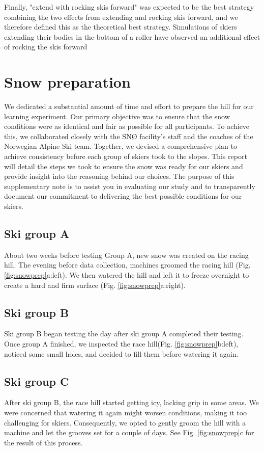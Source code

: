 \documentclass[pdflatex,sn-nature]{sn-jnl}%
\theoremstyle{thmstyleone}%
\theoremstyle{thmstyletwo}%
\theoremstyle{thmstylethree}%
\begin{document}
\begin{appendices}
Finally, "extend with rocking skis forward" was expected to be the best strategy combining the two effects from extending and rocking skis forward, and we therefore defined this as the theoretical best strategy. Simulations of skiers extending their bodies in the bottom of a roller have observed an additional effect of rocking the skis forward \cite{mote_accelerations_1983}


\section{Snow preparation}\label{sup_snowprep}
We dedicated a substantial amount of time and effort to prepare the hill for our learning experiment. Our primary objective was to ensure that the snow conditions were as identical and fair as possible for all participants. To achieve this, we collaborated closely with the SNØ facility’s staff and the coaches of the Norwegian Alpine Ski team. Together, we devised a comprehensive plan to achieve consistency before each group of skiers took to the slopes. This report will detail the steps we took to ensure the snow was ready for our skiers and provide insight into the reasoning behind our choices. The purpose of this supplementary note is to assist you in evaluating our study and to transparently document our commitment to delivering the best possible conditions for our skiers.

\subsection*{Ski group A}
About two weeks before testing Group A, new snow was created on the racing hill. The evening before data collection, machines groomed the racing hill (Fig. \ref{fig:snowprep}a:left). We then watered the hill and left it to freeze overnight to create a hard and firm surface (Fig. \ref{fig:snowprep}a:right). 

\subsection*{Ski group B}
Ski group B began testing the day after ski group A completed their testing. Once group A finished, we inspected the race hill(Fig. \ref{fig:snowprep}b:left), noticed some small holes, and decided to fill them before watering it again. %

\subsection*{Ski group C}
After ski group B, the race hill started getting icy, lacking grip in some areas. We were concerned that watering it again might worsen conditions, making it too challenging for skiers. Consequently, we opted to gently groom the hill with a machine and let the grooves set for a couple of days. See Fig. \ref{fig:snowprep}c for the result of this process.


\end{appendices}
\end{document}
